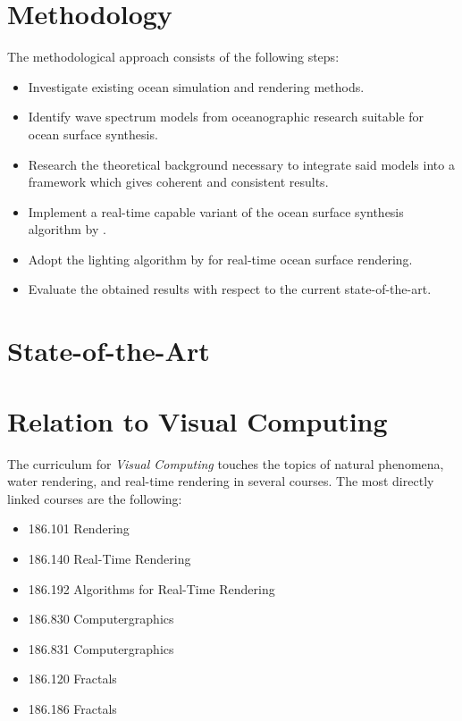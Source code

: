 \documentclass[a4paper,11pt,twoside]{memoir}
\begin{document}
\section{Methodology}
The methodological approach consists of the following steps:
\begin{itemize}
\item Investigate existing ocean simulation and rendering methods.
\item Identify wave spectrum models from oceanographic research suitable for
ocean surface synthesis.
\item Research the theoretical background necessary to integrate said models
into a framework which gives coherent and consistent results.
\item Implement a real-time capable variant of the ocean surface synthesis algorithm by \citet{course:simulatingocean}.
\item Adopt the lighting algorithm by \citet{article:oceanlighting} for real-time ocean surface rendering.
\item Evaluate the obtained results with respect to the current state-of-the-art.
\end{itemize}
\section{State-of-the-Art}

\section{Relation to Visual Computing}
The curriculum for \emph{Visual Computing} touches the topics of natural phenomena,
water rendering, and real-time rendering in several courses. The most directly
linked courses are the following:
\begin{itemize}
\item 186.101 Rendering
\item 186.140 Real-Time Rendering
\item 186.192 Algorithms for Real-Time Rendering
\item 186.830 Computergraphics
\item 186.831 Computergraphics 
\item 186.120 Fractals
\item 186.186 Fractals
\end{itemize}




\end{document}
